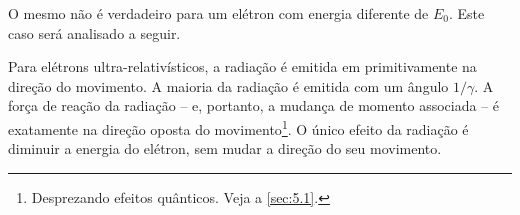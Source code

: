O mesmo não é verdadeiro para um elétron com energia diferente de $E_0$. Este caso será analisado a seguir.

Para elétrons ultra-relativísticos, a radiação é emitida em primitivamente na direção do movimento. A maioria da radiação é emitida com um ângulo $1/\gamma$. A força de reação da radiação -- e, portanto, a mudança de momento associada -- é exatamente na direção oposta do movimento\footnote{Desprezando efeitos quânticos. Veja a \autoref{sec:5.1}.}. O único efeito da radiação é diminuir a energia do elétron, sem mudar a direção do seu movimento.